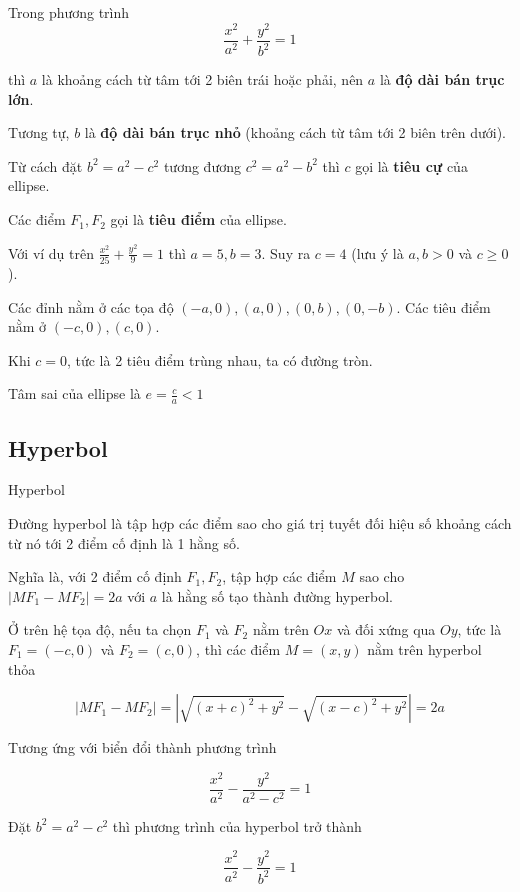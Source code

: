Trong phương trình $$\frac{x^2}{a^2} + \frac{y^2}{b^2} = 1$$

thì $a$ là khoảng cách từ tâm tới 2 biên trái hoặc phải, nên $a$ là \textbf{độ dài bán trục lớn}.

Tương tự, $b$ là \textbf{độ dài bán trục nhỏ} (khoảng cách từ tâm tới 2 biên trên dưới).

Từ cách đặt $b^2 = a^2 - c^2$ tương đương $c^2 = a^2 - b^2$ thì $c$ gọi là \textbf{tiêu cự} của ellipse.

Các điểm $F_1, F_2$ gọi là \textbf{tiêu điểm} của ellipse.

Với ví dụ trên $\frac{x^2}{25} + \frac{y^2}{9} = 1$ thì $a=5, b=3$. Suy ra $c=4$ (lưu ý là $a, b > 0$ và $c \geq 0$).

Các đỉnh nằm ở các tọa độ $(-a, 0), (a, 0), (0, b), (0, -b)$. Các tiêu điểm nằm ở $(-c, 0), (c, 0)$.

\begin{remark}
    Khi $c=0$, tức là 2 tiêu điểm trùng nhau, ta có đường tròn.
\end{remark}

Tâm sai của ellipse là $e = \frac{c}{a} < 1$

\subsection{Hyperbol}

\begin{defblock}{Hyperbol}

    Đường hyperbol là tập hợp các điểm sao cho giá trị tuyết đối hiệu số khoảng cách từ nó tới 2 điểm cố định là 1 hằng số.
\end{defblock}

Nghĩa là, với 2 điểm cố định $F_1, F_2$, tập hợp các điểm $M$ sao cho $| M F_1 - M F_2 | = 2a$ với $a$ là hằng số tạo thành đường hyperbol.

Ở trên hệ tọa độ, nếu ta chọn $F_1$ và $F_2$ nằm trên $Ox$ và đối xứng qua $Oy$, tức là $F_1 = (-c, 0)$ và $F_2 = (c, 0)$, thì các điểm $M = (x, y)$ nằm trên hyperbol thỏa

$$| MF_1 - MF_2 | = | \sqrt{(x+c)^2 + y^2} - \sqrt{(x-c)^2 + y^2} | = 2a$$

Tương ứng với biển đổi thành phương trình

$$\frac{x^2}{a^2} - \frac{y^2}{a^2 - c^2} = 1$$

Đặt $b^2 = a^2 - c^2$ thì phương trình của hyperbol trở thành

$$\frac{x^2}{a^2} - \frac{y^2}{b^2} = 1$$

